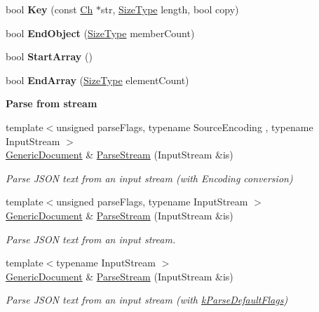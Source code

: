 \begin{DoxyCompactItemize}
\item 
bool {\bfseries Key} (const \hyperlink{a00130_ade0e0ce64ccd5d852da57a35e720bafb}{Ch} $\ast$str, \hyperlink{a00677_a5ed6e6e67250fadbd041127e6386dcb5}{Size\+Type} length, bool copy)\hypertarget{a00115_a600d0950baabbcab11197cacb1459c7a}{}\label{a00115_a600d0950baabbcab11197cacb1459c7a}

\item 
bool {\bfseries End\+Object} (\hyperlink{a00677_a5ed6e6e67250fadbd041127e6386dcb5}{Size\+Type} member\+Count)\hypertarget{a00115_a42f2df68f9c9d8b88a15b609716867d9}{}\label{a00115_a42f2df68f9c9d8b88a15b609716867d9}

\item 
bool {\bfseries Start\+Array} ()\hypertarget{a00115_ae12c513c61745ae731a47b1ca33db063}{}\label{a00115_ae12c513c61745ae731a47b1ca33db063}

\item 
bool {\bfseries End\+Array} (\hyperlink{a00677_a5ed6e6e67250fadbd041127e6386dcb5}{Size\+Type} element\+Count)\hypertarget{a00115_a14097c833bed1a9c7be064ea619c887f}{}\label{a00115_a14097c833bed1a9c7be064ea619c887f}

\end{DoxyCompactItemize}
\begin{Indent}{\bf Parse from stream}\par
\begin{DoxyCompactItemize}
\item 
{\footnotesize template$<$unsigned parse\+Flags, typename Source\+Encoding , typename Input\+Stream $>$ }\\\hyperlink{a00115}{Generic\+Document} \& \hyperlink{a00115_afe94c0abc83a20f2d7dc1ba7677e6238}{Parse\+Stream} (Input\+Stream \&is)
\begin{DoxyCompactList}\small\item\em Parse J\+S\+ON text from an input stream (with Encoding conversion) \end{DoxyCompactList}\item 
{\footnotesize template$<$unsigned parse\+Flags, typename Input\+Stream $>$ }\\\hyperlink{a00115}{Generic\+Document} \& \hyperlink{a00115_a6e154066c6f5024b91aaab25e03700e3}{Parse\+Stream} (Input\+Stream \&is)
\begin{DoxyCompactList}\small\item\em Parse J\+S\+ON text from an input stream. \end{DoxyCompactList}\item 
{\footnotesize template$<$typename Input\+Stream $>$ }\\\hyperlink{a00115}{Generic\+Document} \& \hyperlink{a00115_abe07ededbe9aaceb0058e3d254892b71}{Parse\+Stream} (Input\+Stream \&is)
\begin{DoxyCompactList}\small\item\em Parse J\+S\+ON text from an input stream (with \hyperlink{a00683_ab7be7dabe6ffcba60fad441505583450a9104b0946d648e9467cb7a967401ec80}{k\+Parse\+Default\+Flags}) \end{DoxyCompactList}\end{DoxyCompactItemize}
\end{Indent}
